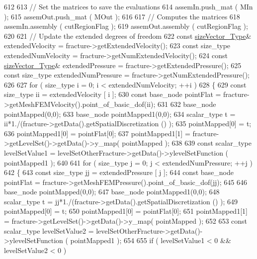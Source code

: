 \begin{DoxyCode}
612 
613     \textcolor{comment}{// Set the matrices to save the evaluations}
614     assemIn.push\_mat ( MIn );
615     assemOut.push\_mat ( MOut );
616 
617     \textcolor{comment}{// Computes the matrices}
618     assemIn.assembly ( cutRegionFlag );
619     assemOut.assembly ( cutRegionFlag );
620 
621     \textcolor{comment}{// Update the extended degrees of freedom}
622     \textcolor{keyword}{const} \hyperlink{Core_8h_a83c51913d041a5001e8683434c09857f}{sizeVector\_Type}& extendedVelocity = fracture->getExtendedVelocity();
623     \textcolor{keyword}{const} size\_type extendedNumVelocity = fracture->getNumExtendedVelocity();
624     \textcolor{keyword}{const} \hyperlink{Core_8h_a83c51913d041a5001e8683434c09857f}{sizeVector\_Type}& extendedPressure = fracture->getExtendedPressure();
625     \textcolor{keyword}{const} size\_type extendedNumPressure = fracture->getNumExtendedPressure();
626 
627     \textcolor{keywordflow}{for} ( size\_type i = 0; i < extendedNumVelocity; ++i )
628     \{
629         \textcolor{keyword}{const} size\_type ii = extendedVelocity [ i ];
630         \textcolor{keyword}{const} base\_node pointFlat = fracture->getMeshFEMVelocity().point\_of\_basic\_dof(ii);
631        
632         base\_node pointMapped(0,0);
633         base\_node pointMapped1(0,0);
634         scalar\_type t = ii*1./(fracture->getData().getSpatialDiscretization () );
635         pointMapped[0] = t;
636         pointMapped1[0] = pointFlat[0];
637         pointMapped1[1] = fracture->getLevelSet()->getData()->y\_map( pointMapped );
638 
639         \textcolor{keyword}{const} scalar\_type levelSetValue1 = levelSetOtherFracture->getData()->ylevelSetFunction ( 
      pointMapped1 );
640 
641         \textcolor{keywordflow}{for} ( size\_type j = 0; j < extendedNumPressure; ++j )
642         \{
643             \textcolor{keyword}{const} size\_type jj = extendedPressure [ j ];
644             \textcolor{keyword}{const} base\_node pointFlat = fracture->getMeshFEMPressure().point\_of\_basic\_dof(jj);
645             
646             base\_node pointMapped(0,0);
647             base\_node pointMapped1(0,0);
648             scalar\_type t = jj*1./(fracture->getData().getSpatialDiscretization () );
649             pointMapped[0] = t;
650             pointMapped1[0] = pointFlat[0];
651             pointMapped1[1] = fracture->getLevelSet()->getData()->y\_map( pointMapped );
652            
653             \textcolor{keyword}{const} scalar\_type levelSetValue2 = levelSetOtherFracture->getData()->ylevelSetFunction ( 
      pointMapped1 );
654 
655             \textcolor{keywordflow}{if} ( levelSetValue1 < 0 && levelSetValue2 < 0 )

\end{DoxyCode}
